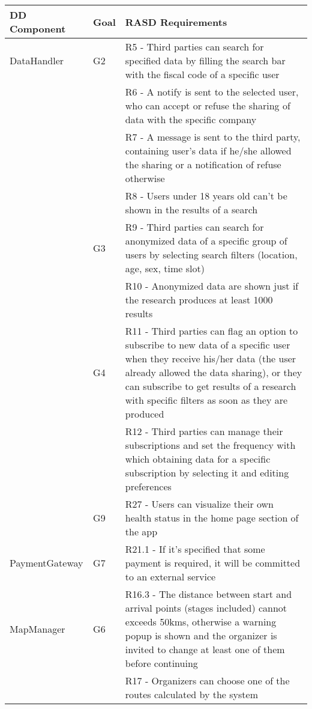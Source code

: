 \begin{table}[]
\begin{adjustbox}{width=\textwidth}
\begin{tabular}{|p{}|p{}|p{}|}
\hline
\textbf{DD Component} & \textbf{Goal} & \textbf{RASD Requirements}\\ \hline					
DataHandler			& G2	 & R5 - Third parties can search for specified data by filling the search bar with the fiscal code of a specific user \\[10pt]
					&		& R6 -	A notify is sent to the selected user, who can accept or refuse the sharing of data with the specific company \\[10pt]
					&		& R7 - A message is sent to the third party, containing user's data if he/she allowed the sharing or a notification of refuse otherwise	\\[10pt]
					&		& R8 - Users under 18 years old can't be shown in the results of a search	\\[10pt]
					& G3	 & R9 - Third parties can search for anonymized data of a specific group of users by selecting search filters (location, age, sex, time slot) \\[10pt]
					&		& R10 - Anonymized data are shown just if the research produces at least 1000 results	 \\[10pt]
					& G4	 & R11 -	Third parties can flag an option to subscribe to new data of a specific user when they receive his/her data (the user already allowed the data sharing), or they can subscribe to get results of a research with specific filters as soon as they are produced \\[10pt]
					&		& R12 - Third parties can manage their subscriptions and set the frequency with which obtaining data for a specific subscription by selecting it and editing preferences	\\[10pt]
					& G9	 & R27 - Users can visualize their own health status in the home page section of the app	\\[10pt] \hline
PaymentGateway		& G7	 & R21.1	 - If it's specified that some payment is required, it will be committed to an external service \\[10pt] \hline
MapManager			& G6	 & R16.3 - The distance between start and arrival points (stages included) cannot exceeds 50kms, otherwise a warning popup is shown and the organizer is invited to change at least one of them before continuing \\[10pt]
					&		& R17 - Organizers can choose one of the routes calculated by the system \\[10pt]

\end{tabular}
\end{adjustbox}
\end{table}
